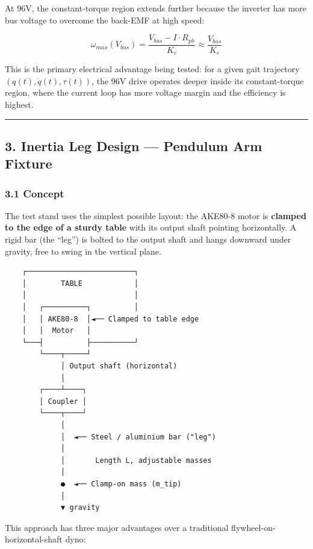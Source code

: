 \documentclass[
]{article}
\begin{document}
At 96V, the constant-torque region extends further because the inverter
has more bus voltage to overcome the back-EMF at high speed:

\[
\omega_{max}(V_{bus}) = \frac{V_{bus} - I \cdot R_{ph}}{K_e} \approx \frac{V_{bus}}{K_e}
\]

This is the primary electrical advantage being tested: for a given gait
trajectory \((q(t), \dot{q}(t), \tau(t))\), the 96V drive operates
deeper inside its constant-torque region, where the current loop has
more voltage margin and the efficiency is highest.

\begin{center}\rule{0.5\linewidth}{0.5pt}\end{center}

\subsection{3. Inertia Leg Design --- Pendulum Arm
Fixture}\label{inertia-leg-design-pendulum-arm-fixture}

\subsubsection{3.1 Concept}\label{concept}

The test stand uses the simplest possible layout: the AKE80-8 motor is
\textbf{clamped to the edge of a sturdy table} with its output shaft
pointing horizontally. A rigid bar (the ``leg'') is bolted to the output
shaft and hangs downward under gravity, free to swing in the vertical
plane.

\begin{verbatim}
    ┌─────────────────────────┐
    │        TABLE            │
    │                         │
    │   ┌──────────┐          │
    │   │ AKE80-8  │◄── Clamped to table edge
    │   │  Motor   │
    └───┤          ├──────────┘
        └────┬─────┘
             │ Output shaft (horizontal)
             │
        ┌────┴────┐
        │ Coupler │
        └────┬────┘
             │
             │  ◄── Steel / aluminium bar ("leg")
             │
             │       Length L, adjustable masses
             │
             ●  ◄── Clamp-on mass (m_tip)
             │
             ▼ gravity
\end{verbatim}

This approach has three major advantages over a traditional
flywheel-on-horizontal-shaft dyno:
\end{document}
